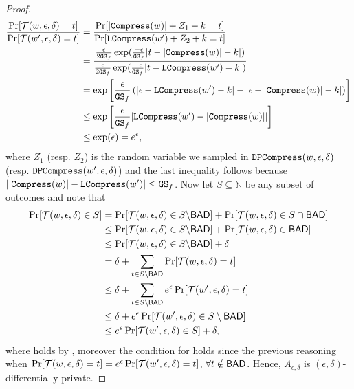 \begin{proof}
        \begin{align*}
        \frac{\Pr[\mathcal{T}(w,\epsilon,\delta)=t]}{\Pr[\mathcal{T}(w',\epsilon,\delta)=t]} &=\frac{\Pr[|\mathtt{Compress}(w)|+Z_1+k=t]}{\Pr[\mathtt{LCompress}(w')+Z_2+k=t]}\\
        &=
            \frac{\frac{\epsilon}{2\mathtt{GS}_f}\exp(\frac{-\epsilon}{\mathtt{GS}_f}|t-|\mathtt{Compress}(w)|-k|)}{\frac{\epsilon}{2\mathtt{GS}_f}\exp(\frac{-\epsilon}{\mathtt{GS}_f}|t-\mathtt{LCompress}(w')-k|)}\\
            &=\exp\left[\frac{\epsilon}{\mathtt{GS}_f}\left(|\epsilon-\mathtt{LCompress}(w')-k|-|\epsilon-|\mathtt{Compress}(w)|-k|\right)\right]  \\
    & \leq \exp\left[\frac{\epsilon}{\mathtt{GS}_f}|\mathtt{LCompress}(w')-|\mathtt{Compress}(w)||\right] \\
    &\leq \exp(\epsilon) = e^{\epsilon} ,
        \end{align*}
        where $Z_1$ (resp. $Z_2$) is the random variable we sampled in $\mathtt{DPCompress}(w,\epsilon,\delta)$ (resp. $\mathtt{DPCompress}(w',\epsilon,\delta)$) and the last inequality follows because $||\mathtt{Compress}(w)|-\mathtt{LCompress}(w')| \leq \mathtt{GS}_f$. Now let $S \subseteq \mathbb{N}$ be any subset of outcomes and note that 
        \begin{align}
            \Pr[\lapalg(w,\epsilon,\delta) \in S] &=  \Pr[\lapalg(w,\epsilon,\delta) \in S \backslash \BAD ] +  \Pr[\lapalg(w,\epsilon,\delta) \in S \cap \BAD ] \nonumber\\
            &\leq  \Pr[\lapalg(w,\epsilon,\delta) \in S \backslash \BAD ] +  \Pr[\lapalg(w,\epsilon,\delta) \in \BAD ] \nonumber\\
            & \leq \Pr[\lapalg(w,\epsilon,\delta) \in S \backslash \BAD ] + \delta \eqnlab{eq:pr:delta}\\
            & = \delta+ \sum_{t \in S \backslash \BAD} \Pr[\lapalg(w,\epsilon,\delta) =t] \nonumber \\
            & \leq \delta + \sum_{t \in S \backslash \BAD} e^{\epsilon} \Pr[\lapalg(w',\epsilon,\delta) =t] \eqnlab{eq:pr:delta_epsilon}\\
                        & \leq \delta +  e^{\epsilon} \Pr[\lapalg(w',\epsilon,\delta) \in S \setminus \BAD] \nonumber\\
                        & \leq e^{\epsilon} \Pr[\lapalg(w',\epsilon,\delta) \in S] + \delta ,\nonumber
        \end{align}
where  holds by , moreover the condition for  holds since the previous reasoning when $\Pr[\mathcal{T}(w,\epsilon,\delta)=t]= e^{\epsilon}\Pr[\mathcal{T}(w',\epsilon,\delta)=t]$, $ \forall t \notin \mathsf{BAD} $. Hence, $A_{\epsilon,\delta}$ is $(\epsilon,\delta)$-differentially private.
\end{proof}